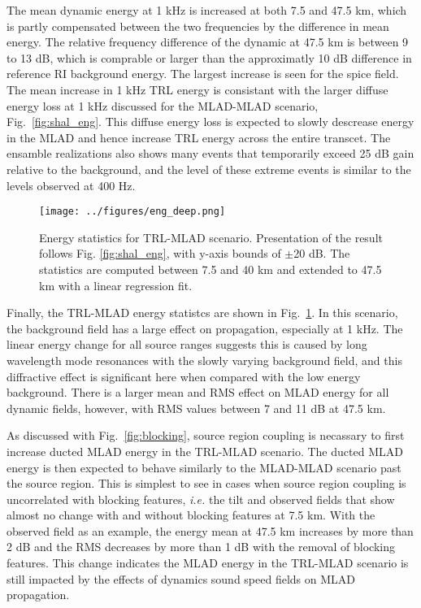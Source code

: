 \documentclass[preprint,NumberedRefs]{JASA}
\begin{document}
The mean dynamic energy at 1 kHz is increased at both 7.5 and 47.5 km, which is partly compensated between the two frequencies by the difference in mean energy. The relative frequency difference of the dynamic at 47.5 km is between 9 to 13 dB, which is comprable or larger than the approximatly 10 dB difference in reference RI background energy. The largest increase is seen for the spice field. The mean increase in 1 kHz TRL energy is consistant with the larger diffuse energy loss at 1 kHz discussed for the MLAD-MLAD scenario, Fig.~\ref{fig:shal_eng}. This diffuse energy loss is expected to slowly descrease energy in the MLAD and hence increase TRL energy across the entire transcet. The ensamble realizations also shows many events that temporarily exceed 25 dB gain relative to the background, and the level of these extreme events is similar to the levels observed at 400 Hz.

\begin{figure}
\texttt{[image: ../figures/eng\_deep.png]}
    \caption{Energy statistics for TRL-MLAD scenario. Presentation of the result follows Fig. \ref{fig:shal_eng}, with y-axis bounds of $\pm$20 dB. The statistics are computed between 7.5 and 40 km and extended to 47.5 km with a linear regression fit.}
    \label{fig:deep_eng}
\end{figure}
Finally, the TRL-MLAD energy statistcs are shown in Fig.~\ref{fig:deep_eng}. In this scenario, the background field has a large effect on propagation, especially at 1 kHz. The linear energy change for all source ranges suggests this is caused by long wavelength mode resonances with the slowly varying background field\cite{colosi21}, and this diffractive effect is significant here when compared with the low energy background. There is a larger mean and RMS effect on MLAD energy for all dynamic fields, however, with RMS values between 7 and 11 dB at 47.5 km.

As discussed with Fig.~\ref{fig:blocking}, source region coupling is necassary to first increase ducted MLAD energy in the TRL-MLAD scenario. The ducted MLAD energy is then expected to behave similarly to the MLAD-MLAD scenario past the source region. This is simplest to see in cases when source region coupling is uncorrelated with blocking features, \emph{i.e.} the tilt and observed fields that show almost no change with and without blocking features at 7.5 km. With the observed field as an example, the energy mean at 47.5 km increases by more than 2 dB and the RMS decreases by more than 1 dB with the removal of blocking features. This change indicates the MLAD energy in the TRL-MLAD scenario is still impacted by the effects of dynamics sound speed fields on MLAD propagation.
\end{document}
